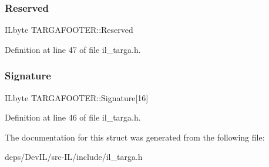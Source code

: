 \subsubsection{\texorpdfstring{Reserved}{Reserved}}
{\footnotesize\ttfamily I\+Lbyte T\+A\+R\+G\+A\+F\+O\+O\+T\+E\+R\+::\+Reserved}



Definition at line 47 of file il\+\_\+targa.\+h.

\mbox{\label{structTARGAFOOTER_a18334acfc857ba73c4e417969abd46ad}} 
\subsubsection{\texorpdfstring{Signature}{Signature}}
{\footnotesize\ttfamily I\+Lbyte T\+A\+R\+G\+A\+F\+O\+O\+T\+E\+R\+::\+Signature\mbox{[}16\mbox{]}}



Definition at line 46 of file il\+\_\+targa.\+h.



The documentation for this struct was generated from the following file\+:\begin{DoxyCompactItemize}
\item 
deps/\+Dev\+I\+L/src-\/\+I\+L/include/il\+\_\+targa.\+h\end{DoxyCompactItemize}
